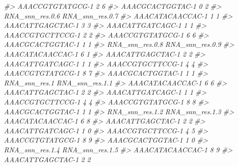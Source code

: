 \documentclass[
]{book}
\newenvironment{Shaded}{\begin{snugshade}}{\end{snugshade}}
\newcommand{\CommentTok}[1]{\textcolor[rgb]{0.56,0.35,0.01}{\textit{#1}}}
\begin{document}
\begin{Shaded}
\begin{Highlighting}[]
\CommentTok{\#\textgreater{} AAACCGTGTATGCG{-}1               2               6}
\CommentTok{\#\textgreater{} AAACGCACTGGTAC{-}1               0               2}
\CommentTok{\#\textgreater{}                  RNA\_snn\_res.0.6 RNA\_snn\_res.0.7}
\CommentTok{\#\textgreater{} AAACATACAACCAC{-}1               1               1}
\CommentTok{\#\textgreater{} AAACATTGAGCTAC{-}1               3               3}
\CommentTok{\#\textgreater{} AAACATTGATCAGC{-}1               1               1}
\CommentTok{\#\textgreater{} AAACCGTGCTTCCG{-}1               2               2}
\CommentTok{\#\textgreater{} AAACCGTGTATGCG{-}1               6               6}
\CommentTok{\#\textgreater{} AAACGCACTGGTAC{-}1               1               1}
\CommentTok{\#\textgreater{}                  RNA\_snn\_res.0.8 RNA\_snn\_res.0.9}
\CommentTok{\#\textgreater{} AAACATACAACCAC{-}1               6               1}
\CommentTok{\#\textgreater{} AAACATTGAGCTAC{-}1               2               2}
\CommentTok{\#\textgreater{} AAACATTGATCAGC{-}1               1               1}
\CommentTok{\#\textgreater{} AAACCGTGCTTCCG{-}1               4               4}
\CommentTok{\#\textgreater{} AAACCGTGTATGCG{-}1               8               7}
\CommentTok{\#\textgreater{} AAACGCACTGGTAC{-}1               1               1}
\CommentTok{\#\textgreater{}                  RNA\_snn\_res.1 RNA\_snn\_res.1.1}
\CommentTok{\#\textgreater{} AAACATACAACCAC{-}1             6               6}
\CommentTok{\#\textgreater{} AAACATTGAGCTAC{-}1             2               2}
\CommentTok{\#\textgreater{} AAACATTGATCAGC{-}1             1               1}
\CommentTok{\#\textgreater{} AAACCGTGCTTCCG{-}1             4               4}
\CommentTok{\#\textgreater{} AAACCGTGTATGCG{-}1             8               8}
\CommentTok{\#\textgreater{} AAACGCACTGGTAC{-}1             1               1}
\CommentTok{\#\textgreater{}                  RNA\_snn\_res.1.2 RNA\_snn\_res.1.3}
\CommentTok{\#\textgreater{} AAACATACAACCAC{-}1               6               8}
\CommentTok{\#\textgreater{} AAACATTGAGCTAC{-}1               2               2}
\CommentTok{\#\textgreater{} AAACATTGATCAGC{-}1               1               0}
\CommentTok{\#\textgreater{} AAACCGTGCTTCCG{-}1               4               5}
\CommentTok{\#\textgreater{} AAACCGTGTATGCG{-}1               8               9}
\CommentTok{\#\textgreater{} AAACGCACTGGTAC{-}1               1               0}
\CommentTok{\#\textgreater{}                  RNA\_snn\_res.1.4 RNA\_snn\_res.1.5}
\CommentTok{\#\textgreater{} AAACATACAACCAC{-}1               8               9}
\CommentTok{\#\textgreater{} AAACATTGAGCTAC{-}1               2               2}

\end{Highlighting}
\end{Shaded}
\end{document}
